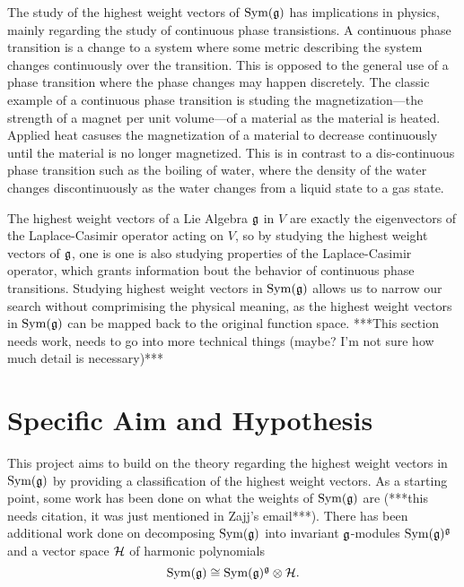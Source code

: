 \documentclass[11pt, reqno]{amsart}
\begin{document}

The study of the highest weight vectors of $\operatorname{Sym}(\mathfrak{g})$ has implications in physics,
mainly regarding the study of continuous phase transistions. A continuous phase 
transition is a change to a system where some metric describing the system changes 
continuously over the transition.\cite{Sa06} This is opposed to the general use of a phase 
transition where the phase changes may happen discretely. The classic example of a 
continuous phase transition is studing the magnetization---the strength of a magnet 
per unit volume---of a material as the material is heated. Applied heat casuses the 
magnetization of a material to decrease continuously until the material is no longer 
magnetized. This is in contrast to a dis-continuous phase transition such as the 
boiling of water, where the density of the water changes discontinuously as the water 
changes from a liquid state to a gas state.

The highest weight vectors of a Lie Algebra $\mathfrak{g}$ in $V$ are exactly the eigenvectors 
of the Laplace-Casimir operator acting on $V$, so by studying the highest weight  
vectors of $\mathfrak{g}$, one is one is also studying properties of the Laplace-Casimir 
operator, which grants information bout the behavior of continuous phase transitions. 
Studying highest weight vectors in $\operatorname{Sym}(\mathfrak{g})$ allows us to narrow our search without
comprimising the physical meaning, as the highest weight vectors in $\operatorname{Sym}(\mathfrak{g})$ can be mapped back to the original function space. ***This section needs work, needs to go into more technical things (maybe? I'm not sure how much detail is necessary)***


\section{Specific Aim and Hypothesis}

This project aims to build on the theory regarding the highest weight vectors in 
$\operatorname{Sym}(\mathfrak{g})$ by providing a classification of the highest weight vectors. As a starting point, some work has been done on what the weights of $\operatorname{Sym}(\mathfrak{g})$ are (***this needs citation, it was just mentioned in Zajj's email***). There has been additional work done on decomposing $\operatorname{Sym}(\mathfrak{g})$ into invariant $\mathfrak{g}$-modules $\operatorname{Sym}(\mathfrak{g})^{\mathfrak{g}}$ and a vector space $\mathcal{H}$ of harmonic polynomials \cite[(3.10)]{NeRa2004}
\[\operatorname{Sym}(\mathfrak{g})\cong\operatorname{Sym}(\mathfrak{g})^{\mathfrak{g}}\otimes\mathcal{H}.\]
\end{document}
